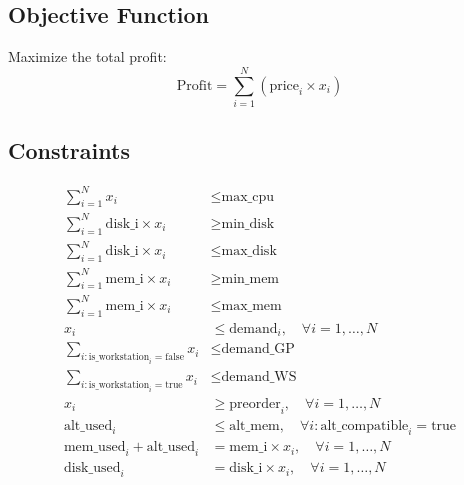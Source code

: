 \documentclass{article}
\begin{document}
\subsection*{Objective Function}
Maximize the total profit:
\[
\text{Profit} = \sum_{i=1}^{N} \left( \text{price}_i \times x_i \right)
\]

\subsection*{Constraints}
\begin{align*}
\sum_{i=1}^{N} x_i & \leq \text{max\_cpu} \\
\sum_{i=1}^{N} \text{disk\_i} \times x_i & \geq \text{min\_disk} \\
\sum_{i=1}^{N} \text{disk\_i} \times x_i & \leq \text{max\_disk} \\
\sum_{i=1}^{N} \text{mem\_i} \times x_i & \geq \text{min\_mem} \\
\sum_{i=1}^{N} \text{mem\_i} \times x_i & \leq \text{max\_mem} \\
x_i & \leq \text{demand}_i, \quad \forall i = 1, \ldots, N \\
\sum_{i: \text{is\_workstation}_i = \text{false}} x_i & \leq \text{demand\_GP} \\
\sum_{i: \text{is\_workstation}_i = \text{true}} x_i & \leq \text{demand\_WS} \\
x_i & \geq \text{preorder}_i, \quad \forall i = 1, \ldots, N \\
\text{alt\_used}_i & \leq \text{alt\_mem}, \quad \forall i: \text{alt\_compatible}_i = \text{true} \\
\text{mem\_used}_i + \text{alt\_used}_i & = \text{mem\_i} \times x_i, \quad \forall i = 1, \ldots, N \\
\text{disk\_used}_i & = \text{disk\_i} \times x_i, \quad \forall i = 1, \ldots, N
\end{align*}
\end{document}
